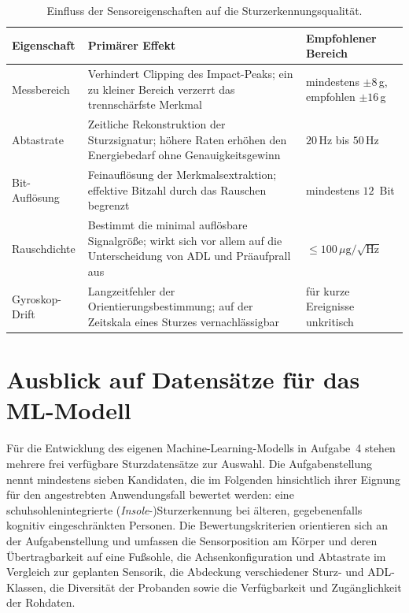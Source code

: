 \documentclass[11pt,a4paper,oneside]{report}
\begin{document}
\begin{table}[H]
\centering
\caption{Einfluss der Sensoreigenschaften auf die Sturzerkennungsqualität.}
\label{tab:properties}
\small
\begin{tabularx}{\textwidth}{l X X}
\toprule
\textbf{Eigenschaft} & \textbf{Primärer Effekt} & \textbf{Empfohlener Bereich} \\
\midrule
Messbereich       & Verhindert Clipping des Impact-Peaks; ein zu kleiner Bereich verzerrt das trennschärfste Merkmal \cite{cornelissen2023clipping,us10152869} & mindestens $\pm 8$\,g, empfohlen $\pm 16$\,g \\
Abtastrate        & Zeitliche Rekonstruktion der Sturzsignatur; höhere Raten erhöhen den Energiebedarf ohne Genauigkeitsgewinn \cite{villar2022sampling,diaz2026sampling} & $20$\,Hz bis $50$\,Hz \\
Bit-Auflösung   & Feinauflösung der Merkmalsextraktion; effektive Bitzahl durch das Rauschen begrenzt \cite{nxp2013an4075} & mindestens $12$~Bit \\
Rauschdichte      & Bestimmt die minimal auflösbare Signalgröße; wirkt sich vor allem auf die Unterscheidung von ADL und Präaufprall aus \cite{arar2022noise} & $\leq 100\,\mu\mathrm{g}/\sqrt{\mathrm{Hz}}$ \\
Gyroskop-Drift    & Langzeitfehler der Orientierungsbestimmung; auf der Zeitskala eines Sturzes vernachlässigbar \cite{vagner2013allan,roetenberg2005} & für kurze Ereignisse unkritisch \\
\bottomrule
\end{tabularx}
\end{table}

\chapter{Ausblick auf Datensätze für das ML-Modell}
\label{ch:datasets}

Für die Entwicklung des eigenen Machine-Learning-Modells in Aufgabe~4 stehen
mehrere frei verfügbare Sturzdatensätze zur Auswahl. Die Aufgabenstellung
nennt mindestens sieben Kandidaten, die im Folgenden hinsichtlich ihrer
Eignung für den angestrebten Anwendungsfall bewertet werden: eine
schuhsohlenintegrierte (\emph{Insole}-)Sturzerkennung bei älteren,
gegebenenfalls kognitiv eingeschränkten Personen. Die Bewertungskriterien
orientieren sich an der Aufgabenstellung und umfassen die Sensorposition am
Körper und deren Übertragbarkeit auf eine Fußsohle, die
Achsenkonfiguration und Abtastrate im Vergleich zur geplanten Sensorik, die
Abdeckung verschiedener Sturz- und ADL-Klassen, die Diversität der Probanden
sowie die Verfügbarkeit und Zugänglichkeit der Rohdaten.
\end{document}
